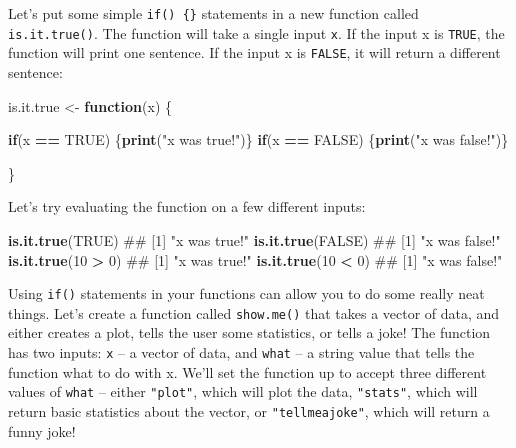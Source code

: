 \documentclass[]{book}
\newenvironment{Shaded}{\begin{snugshade}}{\end{snugshade}}
\newcommand{\KeywordTok}[1]{\textcolor[rgb]{0.13,0.29,0.53}{\textbf{#1}}}
\newcommand{\DecValTok}[1]{\textcolor[rgb]{0.00,0.00,0.81}{#1}}
\newcommand{\StringTok}[1]{\textcolor[rgb]{0.31,0.60,0.02}{#1}}
\newcommand{\OtherTok}[1]{\textcolor[rgb]{0.56,0.35,0.01}{#1}}
\newcommand{\ControlFlowTok}[1]{\textcolor[rgb]{0.13,0.29,0.53}{\textbf{#1}}}
\newcommand{\OperatorTok}[1]{\textcolor[rgb]{0.81,0.36,0.00}{\textbf{#1}}}
\newcommand{\NormalTok}[1]{#1}
\theoremstyle{definition}
\theoremstyle{definition}
\theoremstyle{remark}
\begin{document}
Let's put some simple \texttt{if()\ \{\}} statements in a new function
called \texttt{is.it.true()}. The function will take a single input
\texttt{x}. If the input x is \texttt{TRUE}, the function will print one
sentence. If the input x is \texttt{FALSE}, it will return a different
sentence:

\begin{Shaded}
\begin{Highlighting}[]
\NormalTok{is.it.true <-}\StringTok{ }\ControlFlowTok{function}\NormalTok{(x) \{}
  
\ControlFlowTok{if}\NormalTok{(x }\OperatorTok{==}\StringTok{ }\OtherTok{TRUE}\NormalTok{) \{}\KeywordTok{print}\NormalTok{(}\StringTok{"x was true!"}\NormalTok{)\}}
\ControlFlowTok{if}\NormalTok{(x }\OperatorTok{==}\StringTok{ }\OtherTok{FALSE}\NormalTok{) \{}\KeywordTok{print}\NormalTok{(}\StringTok{"x was false!"}\NormalTok{)\}}
  
\NormalTok{\}}
\end{Highlighting}
\end{Shaded}

Let's try evaluating the function on a few different inputs:

\begin{Shaded}
\begin{Highlighting}[]
\KeywordTok{is.it.true}\NormalTok{(}\OtherTok{TRUE}\NormalTok{)}
\NormalTok{## [1] "x was true!"}
\KeywordTok{is.it.true}\NormalTok{(}\OtherTok{FALSE}\NormalTok{)}
\NormalTok{## [1] "x was false!"}
\KeywordTok{is.it.true}\NormalTok{(}\DecValTok{10} \OperatorTok{>}\StringTok{ }\DecValTok{0}\NormalTok{)}
\NormalTok{## [1] "x was true!"}
\KeywordTok{is.it.true}\NormalTok{(}\DecValTok{10} \OperatorTok{<}\StringTok{ }\DecValTok{0}\NormalTok{)}
\NormalTok{## [1] "x was false!"}
\end{Highlighting}
\end{Shaded}

Using \texttt{if()} statements in your functions can allow you to do
some really neat things. Let's create a function called
\texttt{show.me()} that takes a vector of data, and either creates a
plot, tells the user some statistics, or tells a joke! The function has
two inputs: \texttt{x} -- a vector of data, and \texttt{what} -- a
string value that tells the function what to do with x. We'll set the
function up to accept three different values of \texttt{what} -- either
\texttt{"plot"}, which will plot the data, \texttt{"stats"}, which will
return basic statistics about the vector, or \texttt{"tellmeajoke"},
which will return a funny joke!
\end{document}

